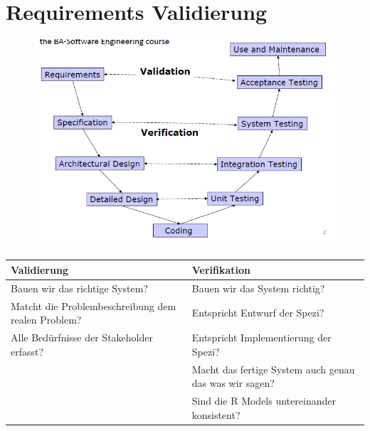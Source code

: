 \section{Requirements Validierung}
\begin{figure}[!h]
	\centering
	\includegraphics[scale=0.7]{img/v_modell.png}
\end{figure}

\begin{table}[!h]
	\begin{tabular}{|p{20em}|p{20em}|}
		\hline
		\textbf{Validierung}	& \textbf{Verifikation}\\
		\hline
		Bauen wir das richtige System? & Bauen wir das System richtig?\\
		\hline
		Matcht die Problembeschreibung dem realen Problem?	& Entspricht Entwurf der Spezi?\\
		\hline
		Alle Bedürfnisse der Stakeholder erfasst? & Entspricht Implementierung der Spezi?\\
		\hline
		& Macht das fertige System auch genau das was wir sagen?\\
		\hline
		& Sind die R Models untereinander konsistent?\\
		\hline
	\end{tabular}
\end{table}

